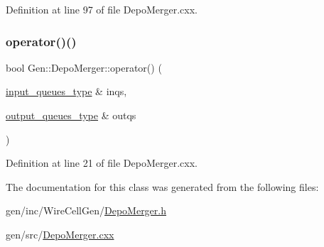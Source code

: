 Definition at line 97 of file Depo\+Merger.\+cxx.

\mbox{\label{class_wire_cell_1_1_gen_1_1_depo_merger_a5130fcd168e7d749e2ee02add469fae3}} 
\subsubsection{\texorpdfstring{operator()()}{operator()()}}
{\footnotesize\ttfamily bool Gen\+::\+Depo\+Merger\+::operator() (\begin{DoxyParamCaption}\item[{\hyperlink{class_wire_cell_1_1_i_hydra_node_ada2ba4a3ba2716c9838ae039e475d683}{input\+\_\+queues\+\_\+type} \&}]{inqs,  }\item[{\hyperlink{class_wire_cell_1_1_i_hydra_node_aeb800228236a385497609533fc0fe256}{output\+\_\+queues\+\_\+type} \&}]{outqs }\end{DoxyParamCaption})\hspace{0.3cm}{\ttfamily [virtual]}}



Definition at line 21 of file Depo\+Merger.\+cxx.



The documentation for this class was generated from the following files\+:\begin{DoxyCompactItemize}
\item 
gen/inc/\+Wire\+Cell\+Gen/\hyperlink{_depo_merger_8h}{Depo\+Merger.\+h}\item 
gen/src/\hyperlink{_depo_merger_8cxx}{Depo\+Merger.\+cxx}\end{DoxyCompactItemize}
